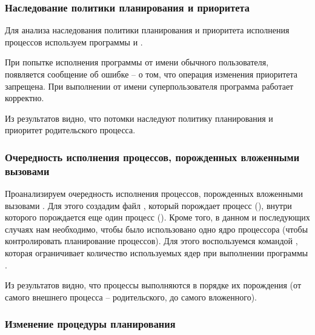 



\subsubsection{Наследование политики планирования и приоритета}

Для анализа наследования политики планирования и приоритета исполнения процессов используем программы  и .





При попытке исполнения программы от имени обычного пользователя, появляется сообщение об ошибке – о том, что операция изменения приоритета запрещена. При выполнении от имени суперпользователя программа работает корректно.



Из результатов видно, что потомки наследуют политику планирования и приоритет родительского процесса.

\subsubsection{Очередность исполнения процессов, порожденных вложенными вызовами }

Проанализируем очередность исполнения процессов, порожденных вложенными вызовами . Для этого создадим файл , который порождает процесс (), внутри которого порождается еще один процесс (). Кроме того, в данном и последующих случаях нам необходимо, чтобы было использовано одно ядро процессора (чтобы контролировать планирование процессов). Для этого воспользуемся командой , которая ограничивает количество используемых ядер при выполнении программы .





Из результатов видно, что процессы выполняются в порядке их порождения (от самого внешнего процесса -- родительского, до самого вложенного).

\subsubsection{Изменение процедуры планирования}

